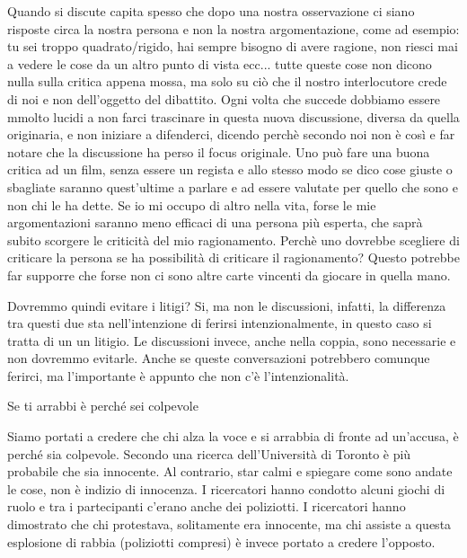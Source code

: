 \documentclass[12pt]{book} %
\begin{document}
Quando si discute capita spesso che dopo una nostra osservazione ci siano risposte circa la nostra persona e non la nostra argomentazione, come ad esempio: tu sei troppo quadrato/rigido, hai sempre bisogno di avere ragione, non riesci mai a vedere le cose da un altro punto di vista ecc... tutte queste cose non dicono nulla sulla critica appena mossa, ma solo su ciò che il nostro interlocutore crede di noi e non dell'oggetto del dibattito. Ogni volta che succede dobbiamo essere mmolto lucidi a non farci trascinare in questa nuova discussione, diversa da quella originaria, e non iniziare a difenderci, dicendo perchè secondo noi non è così e far notare che la discussione ha perso il focus originale. Uno può fare una buona critica ad un film, senza essere un regista e allo stesso modo se dico cose giuste o sbagliate saranno quest'ultime a parlare e ad essere valutate per quello che sono e non chi le ha dette. Se io mi occupo di altro nella vita, forse le mie argomentazioni saranno meno efficaci di una persona più esperta, che saprà subito scorgere le criticità del mio ragionamento. Perchè uno dovrebbe scegliere di criticare la persona se ha possibilità di criticare il ragionamento? Questo potrebbe far supporre che forse non ci sono altre carte vincenti da giocare in quella mano.

Dovremmo quindi evitare i litigi? Si, ma non le discussioni, infatti, la differenza tra questi due sta
nell'intenzione di ferirsi intenzionalmente, in questo caso si tratta di un un litigio. Le
discussioni invece, anche nella coppia, sono necessarie e non dovremmo evitarle. Anche se queste conversazioni
potrebbero comunque ferirci, ma l'importante è appunto che non c'è l'intenzionalità.

\bigskip
\begin{mdframed}[linewidth=1pt]
Se ti arrabbi è perché sei colpevole

Siamo portati a credere che chi alza la voce e si arrabbia di fronte ad un'accusa, è perché sia
colpevole. Secondo una ricerca dell'Università di Toronto è più probabile che sia innocente. Al contrario, star calmi e
spiegare come sono andate le cose, non è indizio di innocenza. I ricercatori hanno condotto alcuni giochi di ruolo e
tra i partecipanti c'erano anche dei poliziotti. I ricercatori hanno dimostrato che chi
protestava, solitamente era innocente, ma chi assiste a questa esplosione di rabbia (poliziotti compresi) è invece
portato a credere l'opposto. 
\end{mdframed}

\bigskip
\end{document}
